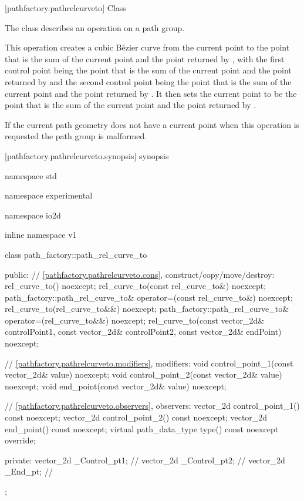  [pathfactory.pathrelcurveto] {Class }

\pnum
{}
The class  describes an operation on a path group.

\pnum
This operation creates a cubic B\'ezier curve from the current point to the point that is the sum of the current point and the point returned by , with the first control point being the point that is the sum of the current point and the point returned by  and the second control point being the point that is the sum of the current point and the point returned by . It then sets the current point to be the point that is the sum of the current point and the point returned by .

\pnum
If the current path geometry does not have a current point when this operation is requested the path group is malformed.

 [pathfactory.pathrelcurveto.synopsis] { synopsis}

\begin{codeblock}
namespace std { namespace experimental { namespace io2d { inline namespace v1 {
  class path_factory::path_rel_curve_to {
  public:
    // \ref{pathfactory.pathrelcurveto.cons}, construct/copy/move/destroy:
    rel_curve_to() noexcept;
    rel_curve_to(const rel_curve_to&) noexcept;
    path_factory::path_rel_curve_to& operator=(const rel_curve_to&) noexcept;
    rel_curve_to(rel_curve_to&&) noexcept;
    path_factory::path_rel_curve_to& operator=(rel_curve_to&&) noexcept;
    rel_curve_to(const vector_2d& controlPoint1, const vector_2d& controlPoint2,
      const vector_2d& endPoint) noexcept;

    // \ref{pathfactory.pathrelcurveto.modifiers}, modifiers:
    void control_point_1(const vector_2d& value) noexcept;
    void control_point_2(const vector_2d& value) noexcept;
    void end_point(const vector_2d& value) noexcept;

    // \ref{pathfactory.pathrelcurveto.observers}, observers:
    vector_2d control_point_1() const noexcept;
    vector_2d control_point_2() const noexcept;
    vector_2d end_point() const noexcept;
    virtual path_data_type type() const noexcept override;
    
  private:
    vector_2d _Control_pt1; // \expos
    vector_2d _Control_pt2; // \expos
    vector_2d _End_pt;      // \expos
  };
} } } }
\end{codeblock}

